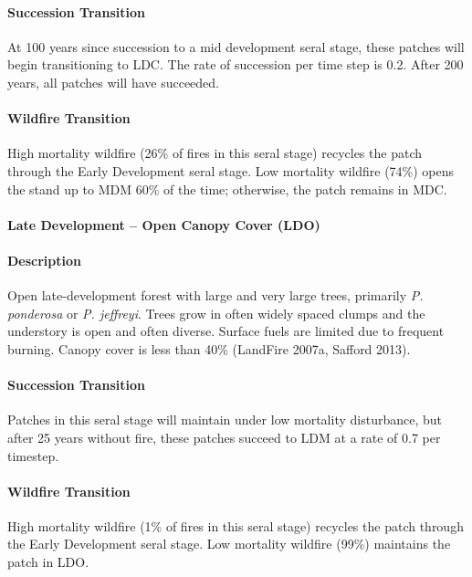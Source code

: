 \paragraph{Succession Transition} At 100 years since succession to a mid development seral stage, these patches will begin transitioning to LDC. The rate of succession per time step is 0.2. After 200 years, all patches will have succeeded.

\paragraph{Wildfire Transition} High mortality wildfire (26\% of fires in this seral stage) recycles the patch through the Early Development seral stage. Low mortality wildfire (74\%) opens the stand up to MDM 60\% of the time; otherwise, the patch remains in MDC.

\noindent\hrulefill


\paragraph{Late Development – Open Canopy Cover (LDO)}

\paragraph{Description} Open late-development forest with large and very large trees, primarily \emph{P. ponderosa} or \emph{P. jeffreyi}. Trees grow in often widely spaced clumps and the understory is open and often diverse. Surface fuels are limited due to frequent burning. Canopy cover is less than 40\% (LandFire 2007a, Safford 2013).

\paragraph{Succession Transition} Patches in this seral stage will maintain under low mortality disturbance, but after 25 years without fire, these patches succeed to LDM at a rate of 0.7 per timestep.

\paragraph{Wildfire Transition} High mortality wildfire (1\% of fires in this seral stage) recycles the patch through the Early Development seral stage. Low mortality wildfire (99\%) maintains the patch in LDO.

\noindent\hrulefill

